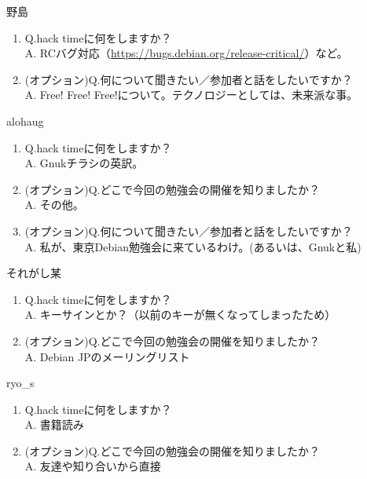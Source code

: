 \begin{prework}{ 野島 }
  \begin{enumerate}
  \item Q.hack timeに何をしますか？\\
    A. RCバグ対応（\url{https://bugs.debian.org/release-critical/}）など。
  \item (オプション)Q.何について聞きたい／参加者と話をしたいですか？\\
    A. Free! Free! Free!について。テクノロジーとしては、未来派な事。
  \end{enumerate}
\end{prework}

\begin{prework}{ alohaug }
  \begin{enumerate}
  \item Q.hack timeに何をしますか？\\
    A. Gnukチラシの英訳。
  \item (オプション)Q.どこで今回の勉強会の開催を知りましたか？\\
    A. その他。
  \item (オプション)Q.何について聞きたい／参加者と話をしたいですか？\\
    A. 私が、東京Debian勉強会に来ているわけ。(あるいは、Gnukと私)
  \end{enumerate}
\end{prework}

\begin{prework}{ それがし某 }
  \begin{enumerate}
  \item Q.hack timeに何をしますか？\\
    A. キーサインとか？（以前のキーが無くなってしまったため）
  \item (オプション)Q.どこで今回の勉強会の開催を知りましたか？\\
    A. Debian JPのメーリングリスト
  \end{enumerate}
\end{prework}

\begin{prework}{ ryo\_s }
  \begin{enumerate}
  \item Q.hack timeに何をしますか？\\
    A. 書籍読み
  \item (オプション)Q.どこで今回の勉強会の開催を知りましたか？\\
    A. 友達や知り合いから直接
  \end{enumerate}
\end{prework}

